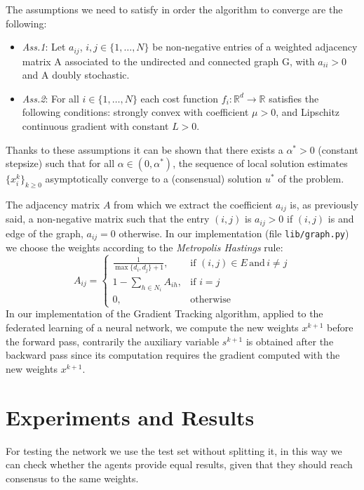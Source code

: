 \documentclass[a4paper,11pt,oneside]{book}
\begin{document}
\bigskip
The assumptions we need to satisfy in order the algorithm to converge are the following:
\begin{itemize}
\item \textit{Ass.1}: Let  $a_{ij}$, $i,j \in \{1, \ldots, N\}$ be non-negative entries of a weighted adjacency matrix A associated to the undirected and connected graph G, with $a_{ii}>0$ and A doubly stochastic.
\item \textit{Ass.2}: For all $i \in \{1, \ldots, N\}$ each cost function $f_i: \mathbb{R}^d \to \mathbb{R}$ satisfies the following conditions: strongly convex with coefficient $\mu >0$, and Lipschitz continuous gradient with constant $L>0$.
\end{itemize}
Thanks to these assumptions it can be shown that there exists a $\alpha^*>0$ (constant stepsize) such that for all $\alpha \in (0,\alpha^*)$, the sequence of local solution estimates $\{x_i^k\}_{k\geq0}$ asymptotically converge to a (consensual) solution $u^*$ of the problem.

\bigskip
The adjacency matrix $A$ from which we extract the coefficient $a_{ij}$ is, as previously said, a non-negative matrix such that the entry $(i,j)$ is $a_{ij}>0$ if $(i,j)$ is and edge of the graph, $a_{ij}=0$ otherwise.
In our implementation (file \texttt{lib/graph.py}) we choose the weights according to the \textit{Metropolis Hastings} rule:
\begin{equation}
A_{ij} = 
\begin{cases}
\frac{1}{\max\{d_i,d_j\}+1},  &\text{if } (i,j) \in E\, \text{and}\, i \neq j \\
1-\sum_{h \in N_i} A_{ih}, &\text{if }  i=j \\
0, &\text{otherwise}
\end{cases}
\end{equation}
In our implementation of the Gradient Tracking algorithm, applied to the federated learning of a neural network,  we compute the new weights $x^{k+1}$ before the forward pass, contrarily the auxiliary variable $s^{k+1}$ is obtained after the backward pass since its computation requires the gradient computed with the new weights $x^{k+1}$.

\section{Experiments and Results}
For testing the network we use the test set without splitting it, in this way we can check whether the agents provide equal results, given that they should reach consensus to the same weights. 
\end{document}
